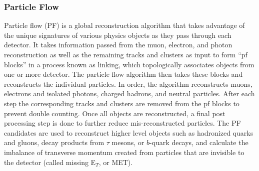 \subsubsection{Particle Flow} \label{sec:CMS_PF}
Particle flow (PF) is a global reconstruction algorithm that takes advantage of the unique signatures of various physics objects as they pass through each detector. It takes information passed from the muon, electron, and photon reconstruction as well as the remaining tracks and clusters as input to form ``pf blocks'' in a process known as linking, which topologically associates objects from one or more detector. The particle flow algorithm then takes these blocks and reconstructs the individual particles. In order, the algorithm reconstructs muons, electrons and isolated photons, charged hadrons, and neutral particles. After each step the corresponding tracks and clusters are removed from the pf blocks to prevent double counting. Once all objects are reconstructed, a final post processing step is done to further reduce mis-reconstructed particles. The PF candidates are used to reconstruct higher level objects such as hadronized quarks and gluons, decay products from $\tau$ mesons, or $b$-quark decays, and calculate the imbalance of transverse momentum created from particles that are invisible to the detector (called missing E$_T$, or MET)\cite{Sirunyan:PF}.
